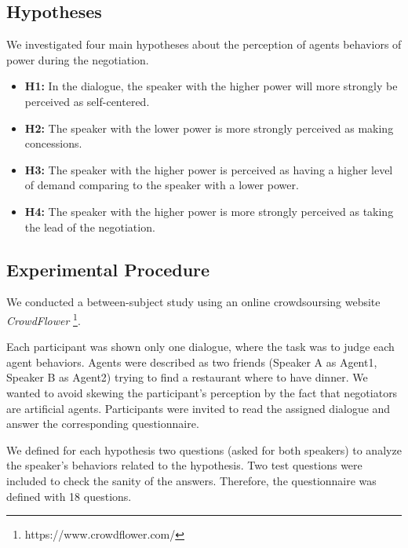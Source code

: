 \documentclass{llncs}
\begin{document}
	\subsection{Hypotheses}
	We investigated four main hypotheses about the perception of agents behaviors of power during the negotiation. 
	\begin{itemize}
	\item  \textbf{H1:} In the dialogue, the speaker with the higher power will more strongly be perceived as self-centered.  
	
	\item \textbf{H2:} The speaker with the lower power is more strongly perceived as making concessions.
	
	\item \textbf{H3:} The speaker with the higher power is perceived as having a higher level of demand comparing to the speaker with a lower power.
	
	\item \textbf{H4:} The speaker with the higher power is more strongly perceived as taking the lead of the negotiation.
	
	\end{itemize}
	
	\subsection{Experimental Procedure}
	
	We conducted a between-subject study using an online crowdsoursing website \emph{CrowdFlower} \footnote{https://www.crowdflower.com/}. 
	
	
	Each participant was shown only one dialogue, where the task was to judge each agent behaviors. Agents were described as two friends (Speaker A as Agent1, Speaker B as Agent2) trying to find a restaurant where to have dinner. We wanted to avoid skewing the participant's perception by the fact that negotiators are artificial agents. Participants were invited to read the assigned dialogue and answer the corresponding questionnaire. 
	
	We defined for each hypothesis two questions (asked for both speakers) to analyze the speaker's behaviors related to the hypothesis. 
	Two test questions were included to check the sanity of the answers. Therefore, the questionnaire was defined with 18 questions.
	
\end{document}
